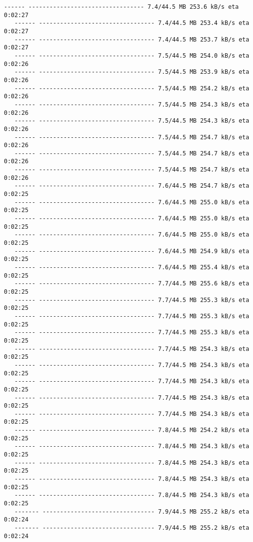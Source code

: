 \documentclass[11pt]{article}
\begin{document}
\begin{Verbatim}[commandchars=\\\{\}]
   ------ --------------------------------- 7.4/44.5 MB 253.6 kB/s eta 0:02:27
   ------ --------------------------------- 7.4/44.5 MB 253.4 kB/s eta 0:02:27
   ------ --------------------------------- 7.4/44.5 MB 253.7 kB/s eta 0:02:27
   ------ --------------------------------- 7.5/44.5 MB 254.0 kB/s eta 0:02:26
   ------ --------------------------------- 7.5/44.5 MB 253.9 kB/s eta 0:02:26
   ------ --------------------------------- 7.5/44.5 MB 254.2 kB/s eta 0:02:26
   ------ --------------------------------- 7.5/44.5 MB 254.3 kB/s eta 0:02:26
   ------ --------------------------------- 7.5/44.5 MB 254.3 kB/s eta 0:02:26
   ------ --------------------------------- 7.5/44.5 MB 254.7 kB/s eta 0:02:26
   ------ --------------------------------- 7.5/44.5 MB 254.7 kB/s eta 0:02:26
   ------ --------------------------------- 7.5/44.5 MB 254.7 kB/s eta 0:02:26
   ------ --------------------------------- 7.6/44.5 MB 254.7 kB/s eta 0:02:25
   ------ --------------------------------- 7.6/44.5 MB 255.0 kB/s eta 0:02:25
   ------ --------------------------------- 7.6/44.5 MB 255.0 kB/s eta 0:02:25
   ------ --------------------------------- 7.6/44.5 MB 255.0 kB/s eta 0:02:25
   ------ --------------------------------- 7.6/44.5 MB 254.9 kB/s eta 0:02:25
   ------ --------------------------------- 7.6/44.5 MB 255.4 kB/s eta 0:02:25
   ------ --------------------------------- 7.7/44.5 MB 255.6 kB/s eta 0:02:25
   ------ --------------------------------- 7.7/44.5 MB 255.3 kB/s eta 0:02:25
   ------ --------------------------------- 7.7/44.5 MB 255.3 kB/s eta 0:02:25
   ------ --------------------------------- 7.7/44.5 MB 255.3 kB/s eta 0:02:25
   ------ --------------------------------- 7.7/44.5 MB 254.3 kB/s eta 0:02:25
   ------ --------------------------------- 7.7/44.5 MB 254.3 kB/s eta 0:02:25
   ------ --------------------------------- 7.7/44.5 MB 254.3 kB/s eta 0:02:25
   ------ --------------------------------- 7.7/44.5 MB 254.3 kB/s eta 0:02:25
   ------ --------------------------------- 7.7/44.5 MB 254.3 kB/s eta 0:02:25
   ------ --------------------------------- 7.8/44.5 MB 254.2 kB/s eta 0:02:25
   ------ --------------------------------- 7.8/44.5 MB 254.3 kB/s eta 0:02:25
   ------ --------------------------------- 7.8/44.5 MB 254.3 kB/s eta 0:02:25
   ------ --------------------------------- 7.8/44.5 MB 254.3 kB/s eta 0:02:25
   ------ --------------------------------- 7.8/44.5 MB 254.3 kB/s eta 0:02:25
   ------- -------------------------------- 7.9/44.5 MB 255.2 kB/s eta 0:02:24
   ------- -------------------------------- 7.9/44.5 MB 255.2 kB/s eta 0:02:24

\end{Verbatim}
\end{document}
